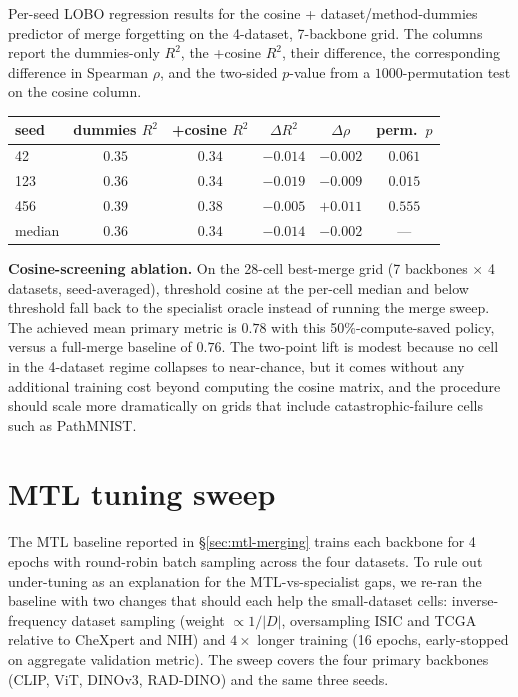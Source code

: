 \documentclass{article}
\begin{document}
Per-seed LOBO regression results for the cosine + dataset/method-dummies predictor of merge forgetting on the 4-dataset, 7-backbone grid. The columns report the dummies-only $R^2$, the +cosine $R^2$, their difference, the corresponding difference in Spearman $\rho$, and the two-sided $p$-value from a $1000$-permutation test on the cosine column.

\begin{center}
\small
\begin{tabular}{lccccc}
\toprule
seed & dummies $R^2$ & +cosine $R^2$ & $\Delta R^2$ & $\Delta \rho$ & perm.\ $p$ \\
\midrule
42  & $0.35$ & $0.34$ & $-0.014$ & $-0.002$ & $0.061$ \\
123 & $0.36$ & $0.34$ & $-0.019$ & $-0.009$ & $0.015$ \\
456 & $0.39$ & $0.38$ & $-0.005$ & $+0.011$ & $0.555$ \\
\midrule
median & $\mathbf{0.36}$ & $0.34$ & $\mathbf{-0.014}$ & $-0.002$ & --- \\
\bottomrule
\end{tabular}
\end{center}

\noindent\textbf{Cosine-screening ablation.} On the 28-cell best-merge grid (7 backbones $\times$ 4 datasets, seed-averaged), threshold cosine at the per-cell median and below threshold fall back to the specialist oracle instead of running the merge sweep. The achieved mean primary metric is $0.78$ with this 50\%-compute-saved policy, versus a full-merge baseline of $0.76$. The two-point lift is modest because no cell in the 4-dataset regime collapses to near-chance, but it comes without any additional training cost beyond computing the cosine matrix, and the procedure should scale more dramatically on grids that include catastrophic-failure cells such as PathMNIST.

\section{MTL tuning sweep}
\label{sec:mtl-tuning}

The MTL baseline reported in \S\ref{sec:mtl-merging} trains each backbone for 4 epochs with round-robin batch sampling across the four datasets. To rule out under-tuning as an explanation for the MTL-vs-specialist gaps, we re-ran the baseline with two changes that should each help the small-dataset cells: inverse-frequency dataset sampling (weight $\propto 1/|D|$, oversampling ISIC and TCGA relative to CheXpert and NIH) and $4\times$ longer training (16 epochs, early-stopped on aggregate validation metric). The sweep covers the four primary backbones (CLIP, ViT, DINOv3, RAD-DINO) and the same three seeds.
\end{document}
